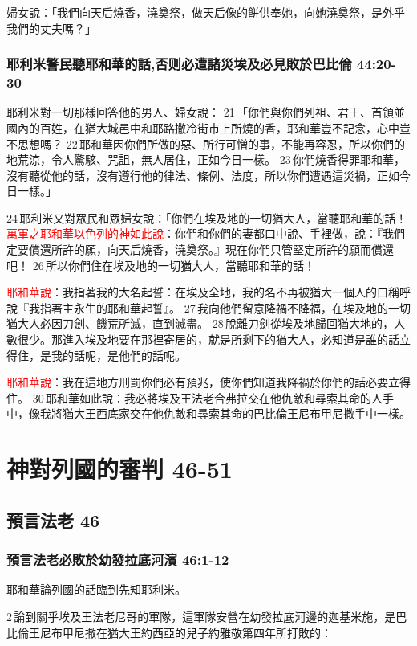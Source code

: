 婦女說：「我們向天后燒香，澆奠祭，做天后像的餅供奉她，向她澆奠祭，是外乎我們的丈夫嗎？」

\subsubsection{耶利米警民聽耶和華的話,否则必遭諸災埃及必見敗於巴比倫 44:20-30}
耶利米對一切那樣回答他的男人、婦女說： 21 「你們與你們列祖、君王、首領並國內的百姓，在猶大城邑中和耶路撒冷街市上所燒的香，耶和華豈不記念，心中豈不思想嗎？ 22 耶和華因你們所做的惡、所行可憎的事，不能再容忍，所以你們的地荒涼，令人驚駭、咒詛，無人居住，正如今日一樣。 23 你們燒香得罪耶和華，沒有聽從他的話，沒有遵行他的律法、條例、法度，所以你們遭遇這災禍，正如今日一樣。」

24 耶利米又對眾民和眾婦女說：「你們在埃及地的一切猶大人，當聽耶和華的話！\textcolor{red}{萬軍之耶和華以色列的神如此說}：你們和你們的妻都口中說、手裡做，說：『我們定要償還所許的願，向天后燒香，澆奠祭。』現在你們只管堅定所許的願而償還吧！ 26 所以你們住在埃及地的一切猶大人，當聽耶和華的話！

\textcolor{red}{耶和華說}：我指著我的大名起誓：在埃及全地，我的名不再被猶大一個人的口稱呼說『我指著主永生的耶和華起誓』。 27 我向他們留意降禍不降福，在埃及地的一切猶大人必因刀劍、饑荒所滅，直到滅盡。 28 脫離刀劍從埃及地歸回猶大地的，人數很少。那進入埃及地要在那裡寄居的，就是所剩下的猶大人，必知道是誰的話立得住，是我的話呢，是他們的話呢。

\textcolor{red}{耶和華說}：我在這地方刑罰你們必有預兆，使你們知道我降禍於你們的話必要立得住。 30 耶和華如此說：我必將埃及王法老合弗拉交在他仇敵和尋索其命的人手中，像我將猶大王西底家交在他仇敵和尋索其命的巴比倫王尼布甲尼撒手中一樣。



\section{神對列國的審判 46-51}
\subsection{預言法老 46}
\subsubsection{預言法老必敗於幼發拉底河濱 46:1-12}
耶和華論列國的話臨到先知耶利米。

2 論到關乎埃及王法老尼哥的軍隊，這軍隊安營在幼發拉底河邊的迦基米施，是巴比倫王尼布甲尼撒在猶大王約西亞的兒子約雅敬第四年所打敗的：

